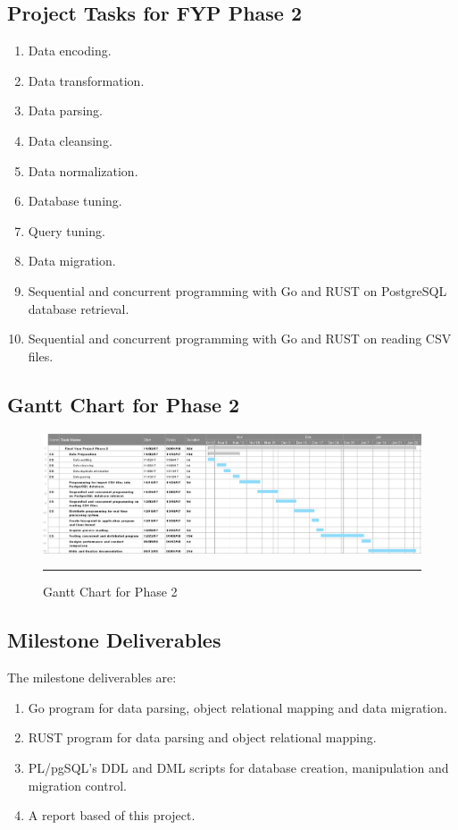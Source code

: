 \subsection{Project Tasks for FYP Phase 2}

\begin{enumerate}[topsep=0pt,itemsep=-1ex,partopsep=1ex,parsep=1.5ex]
	\item Data encoding.
	\item Data transformation. 
	\item Data parsing. 
	\item Data cleansing. 
	\item Data normalization.
	\item Database tuning. 
	\item Query tuning. 
	\item Data migration.
	\item Sequential and concurrent programming with Go and RUST on PostgreSQL database retrieval.
	\item Sequential and concurrent programming with Go and RUST on reading CSV files.
	
\end{enumerate}

\begin{landscape}
	\subsection{Gantt Chart for Phase 2}
	\begin{figure}[H]
		\centering
		\includegraphics[width=1.5\textwidth]{Figure/Gantt2.png}
		\rule{35em}{0.5pt}
		\caption[Gantt Chart for Phase 2]{Gantt Chart for Phase 2}
	\end{figure}
\end{landscape}


\subsection{Milestone Deliverables}
The milestone deliverables are:

\begin{enumerate}[topsep=0pt,itemsep=-1ex,partopsep=1ex,parsep=1ex]
\item Go program for data parsing, object relational mapping and data migration. 
\item RUST program for data parsing and object relational mapping.
\item PL/pgSQL's DDL and DML scripts for database creation, manipulation and migration control.
\item A report based of this project. 
\end{enumerate}

